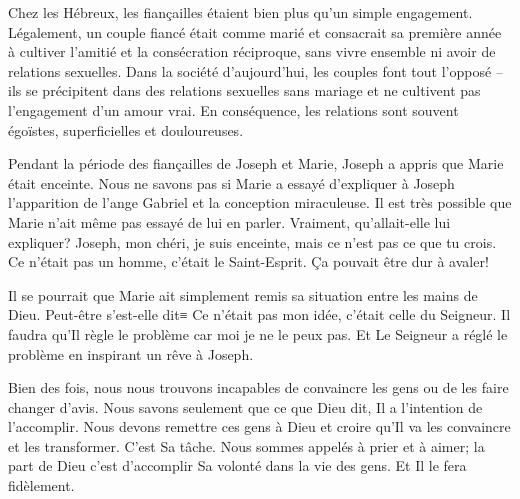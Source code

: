 


Chez les Hébreux, les fiançailles étaient bien plus qu'un simple engagement. Légalement, un couple fiancé était comme marié et consacrait sa première année à cultiver l'amitié et la consécration réciproque, sans vivre ensemble ni avoir de relations sexuelles. Dans la société d'aujourd'hui, les couples font tout l'opposé – ils se précipitent dans des relations sexuelles sans mariage et ne cultivent pas l'engagement d'un amour vrai. En conséquence, les relations sont souvent égoïstes, superficielles et douloureuses.

Pendant la période des fiançailles de Joseph et Marie, Joseph a appris que Marie était enceinte. Nous ne savons pas si Marie a essayé d'expliquer à Joseph l'apparition de l'ange Gabriel et la conception miraculeuse. Il est très possible que Marie n'ait même pas essayé de lui en parler. Vraiment, qu'allait-elle lui expliquer? \og Joseph, mon chéri, je suis enceinte, mais ce n'est pas ce que tu crois. Ce n'était pas un homme, c'était le Saint-Esprit. \fg{} Ça pouvait être dur à avaler!

Il se pourrait que Marie ait simplement remis sa situation entre les mains de Dieu. Peut-être s'est-elle dit≡ \og Ce n'était pas mon idée, c'était celle du Seigneur. Il faudra qu'Il règle le problème car moi je ne le peux pas. \fg{} Et Le Seigneur a réglé le problème en inspirant un rêve à Joseph.

Bien des fois, nous nous trouvons incapables de convaincre les gens ou de les faire changer d'avis. Nous savons seulement que ce que Dieu dit, Il a l'intention de l'accomplir. Nous devons remettre ces gens à Dieu et croire qu'Il va les convaincre et les transformer. C'est Sa tâche. Nous sommes appelés à prier et à aimer; la part de Dieu c'est d'accomplir Sa volonté dans la vie des gens. Et Il le fera fidèlement.




                      

